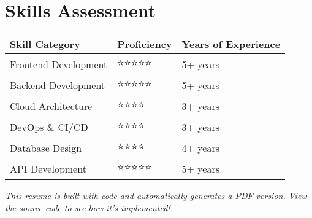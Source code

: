 \documentclass[11pt,a4paper]{article}
\begin{document}
\section{Skills Assessment}

\begin{center}
\begin{tabular}{lll}
\toprule
\textbf{Skill Category} & \textbf{Proficiency} & \textbf{Years of Experience} \\
\midrule
Frontend Development & ⭐⭐⭐⭐⭐ & 5+ years \\
Backend Development & ⭐⭐⭐⭐⭐ & 5+ years \\
Cloud Architecture & ⭐⭐⭐⭐ & 3+ years \\
DevOps \& CI/CD & ⭐⭐⭐⭐ & 3+ years \\
Database Design & ⭐⭐⭐⭐ & 4+ years \\
API Development & ⭐⭐⭐⭐⭐ & 5+ years \\
\bottomrule
\end{tabular}
\end{center}

\vfill
\begin{center}
\small\textit{This resume is built with code and automatically generates a PDF version. View the source code to see how it's implemented!}
\end{center}
\end{document}
